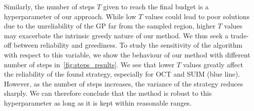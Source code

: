 
Similarly, the number of steps $T$ given to reach the final budget is a hyperparameter of our approach. While low $T$ values could lead to poor solutions due to the unreliability of the GP far from the sampled region, higher $T$ values may exacerbate the intrinsic greedy nature of our method. We thus seek a trade-off between reliability and greediness. To study the sensitivity of the algorithm with respect to this variable, we show the behaviour of our method with different number of steps in~\cref{fig:steps_results}. We see that lower $T$ values greatly affect the reliability of the found strategy, especially for OCT and SUIM (blue line). However, as the number of steps increases, the variance of the strategy reduces sharply. We can therefore conclude that the method is robust to this hyperparameter as long as it is kept within reasonable ranges.


